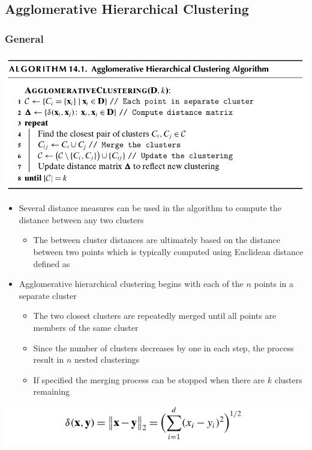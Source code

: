 \documentclass[11pt]{article}
\begin{document}
\subsection{Agglomerative Hierarchical Clustering}
\label{sec:org06ce526}
\subsubsection{General}
\label{sec:orgfc56058}
\begin{center}
\includegraphics[width=.9\linewidth]{Hierarchical Clustering/screenshot_2018-12-01_11-29-20.png}
\end{center}
\begin{itemize}
\item Several distance measures can be used in the algorithm to compute the distance between any two clusters 
\begin{itemize}
\item The between cluster distances are ultimately based on the distance between two points which is typically computed using Euclidean distance defined as
\end{itemize}

\item Agglomerative hierarchical clustering begins with each of the \(n\) points in a separate cluster
\begin{itemize}
\item The two closest clusters are repeatedly merged until all points are members of the same cluster
\item Since the number of clusters decreases by one in each step, the process result in \(n\) nested clusterings
\item If specified the merging process can be stopped when there are \(k\) clusters remaining
\end{itemize}
\end{itemize}
\begin{center}
\includegraphics[width=.9\linewidth]{Hierarchical Clustering/screenshot_2018-12-01_11-36-31.png}
\end{center}
\end{document}
